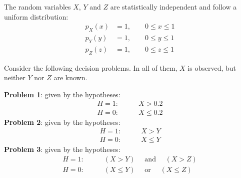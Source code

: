 \else 


The random variables $X$, $Y$ and $Z$ are statistically independent and follow a uniform distribution:
\begin{align*}
p_X(x) &= 1,    \qquad 0 \le x \le 1  \\
p_Y(y) &= 1,    \qquad 0 \le y \le 1  \\
p_Z(z) &= 1,    \qquad 0 \le z \le 1
\end{align*}

Consider the following decision problems. In all of them, $X$ is observed, but neither $Y$ nor $Z$ are known.

\textbf{Problem 1}: given by the hypotheses:
\begin{align*}
H=1: & \qquad  X > 0.2   \\
H=0: & \qquad  X \le 0.2
\end{align*}
\textbf{Problem 2}: given by the hypotheses:
\begin{align*}
H=1: & \qquad  X > Y   \\
H=0: & \qquad  X \le Y
\end{align*}
\textbf{Problem 3}: given by the hypotheses:
\begin{align*}
H=1: & \qquad (X > Y)   \quad \text{ and }\quad (X > Z) \\
H=0: & \qquad (X \le Y) \quad \text{ or }\quad (X \le Z)
\end{align*}



